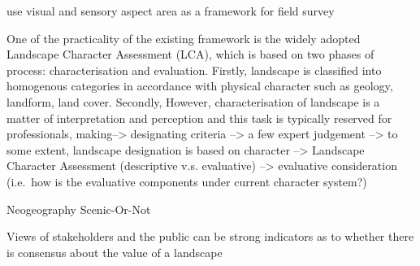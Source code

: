\documentclass[]{elsarticle} %
\begin{document}
use visual and sensory aspect area as a framework for field survey

One of the practicality of the existing framework is the widely adopted
Landscape Character Assessment (LCA), which is based on two phases of
process: characterisation and evaluation. Firstly, landscape is
classified into homogenous categories in accordance with physical
character such as geology, landform, land cover. Secondly, However,
characterisation of landscape is a matter of interpretation and
perception and this task is typically reserved for professionals,
making--\textgreater{} designating criteria --\textgreater{} a few
expert judgement --\textgreater{} to some extent, landscape designation
is based on character --\textgreater{} Landscape Character Assessment
(descriptive v.s. evaluative) --\textgreater{} evaluative consideration
(i.e.~how is the evaluative components under current character system?)

Neogeography Scenic-Or-Not

Views of stakeholders and the public can be strong indicators as to
whether there is consensus about the value of a landscape
\end{document}
